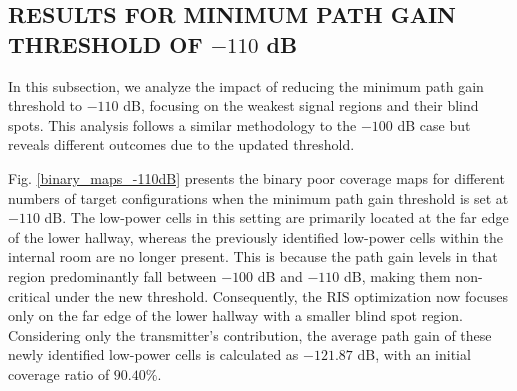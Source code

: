 \documentclass{IEEEoj}
\begin{document}
\subsection{RESULTS FOR MINIMUM PATH GAIN THRESHOLD OF $-110$ dB}
In this subsection, we analyze the impact of reducing the minimum path gain threshold to $-110$ dB, focusing on the weakest signal regions and their blind spots. This analysis follows a similar methodology to the $-100$ dB case but reveals different outcomes due to the updated threshold.

Fig. \ref{binary_maps_-110dB} presents the binary poor coverage maps for different numbers of target configurations when the minimum path gain threshold is set at $-110$ dB. The low-power cells in this setting are primarily located at the far edge of the lower hallway, whereas the previously identified low-power cells within the internal room are no longer present. This is because the path gain levels in that region predominantly fall between $-100$ dB and $-110$ dB, making them non-critical under the new threshold. Consequently, the RIS optimization now focuses only on the far edge of the lower hallway with a smaller blind spot region. Considering only the transmitter's contribution, the average path gain of these newly identified low-power cells is calculated as $-121.87$ dB, with an initial coverage ratio of $90.40\%$.
\end{document}
